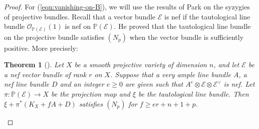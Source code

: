 \documentclass[a4paper]{amsart}
\numberwithin{equation}{section}
\theoremstyle{plain}
\newtheorem{thm}{Theorem}[section]
\theoremstyle{definition}
\theoremstyle{remark}
\numberwithin{figure}{section}
\numberwithin{table}{section}
\numberwithin{equation}{section}
\def \PP {\mathbb{P}}
\def \Ecal {\mathcal{E}}
\def \Ocal {\mathcal{O}}
\begin{document}
\begin{proof}
For (\ref{eqn:vanishing-on-B}), we will use the results of Park \cite{Park2007} on the syzygies of projective bundles.
Recall that a vector bundle $\Ecal$ is nef if the tautological line bundle $\Ocal_{\PP(\Ecal)}(1)$ is nef on $\PP(\Ecal)$.
He proved that the tautological line bundle on the projective bundle satisfies $(N_p)$ when the vector bundle is sufficiently positive.
More precisely:

\begin{thm} [{\cite[Theorem~1.2]{Park2007}}] \label{thm:syzygies-of-projective-bundles}
    Let $X$ be a smooth projective variety of dimension $n$, and let $\Ecal$ be a nef vector bundle of rank $r$ on $X$.
    Suppose that a very ample line bundle $A$, a nef line bundle $D$ and an integer $e \geq 0$ are given such that $A^{e} \otimes \Ecal \otimes \Ecal^{\vee}$ is nef.
    Let $\pi: \PP(\Ecal) \rightarrow X$ be the projection map and $\xi$ be the tautological line bundle.
    Then $\xi + \pi^{\ast}(K_X + fA + D)$ satisfies $(N_p)$ for $f \geq er+n+1+p$.
\end{thm}


\end{proof}
\end{document}
